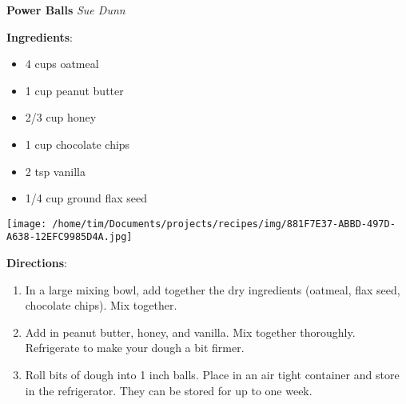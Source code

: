 \documentclass[11pt, twoside, openany]{book}
\begin{document}
\noindent\begin{minipage}[t]{\linewidth}%
{\Large\textbf{Power Balls}} \label{power-balls}\hfill\textit{Sue Dunn}\\
\noindent\begin{minipage}[t]{0.78\linewidth}%
\textbf{Ingredients}:\vspace{-3mm}
\begin{multicols}{2}
\begin{itemize}\setlength\itemsep{-1mm}
\item 4 cups oatmeal
\item 1 cup peanut butter
\item 2/3 cup honey
\item 1 cup chocolate chips
\item 2 tsp vanilla
\item 1/4 cup ground flax seed
\end{itemize}
\end{multicols}
\end{minipage}
\noindent\begin{minipage}[t]{0.18\linewidth}
\centering \strut\vspace*{-\baselineskip}\newline
\texttt{[image: /home/tim/Documents/projects/recipes/img/881F7E37-ABBD-497D-A638-12EFC9985D4A.jpg]}\\
\end{minipage}\vspace{3mm}
\textbf{Directions}:
\vspace{-3mm}\begin{enumerate}\setlength\itemsep{-1mm}
\item In a large mixing bowl, add together the dry ingredients (oatmeal, flax seed, chocolate chips). Mix together.
\item Add in peanut butter, honey, and vanilla. Mix together thoroughly. Refrigerate to make your dough a bit firmer.
\item Roll bits of dough into 1 inch balls. Place in an air tight container and store in the refrigerator. They can be stored for up to one week.
\end{enumerate}
\end{minipage}\vspace{8mm}
\end{document}
